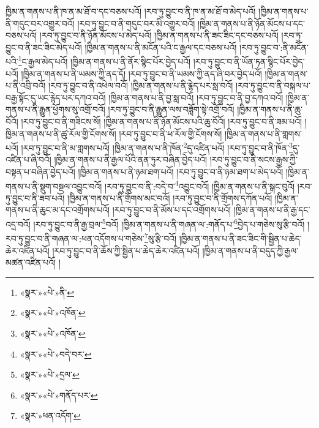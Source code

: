 ཁྱིམ་ན་གནས་པ་ནི་ཁ་ན་མ་ཐོ་བ་དང་བཅས་པའོ། །རབ་ཏུ་བྱུང་བ་ནི་ཁ་ན་མ་ཐོ་བ་མེད་པའོ། །ཁྱིམ་ན་གནས་པ་ནི་གདུང་བར་འགྱུར་བའོ། །རབ་ཏུ་བྱུང་བ་ནི་གདུང་བར་མི་འགྱུར་བའོ། །ཁྱིམ་ན་གནས་པ་ནི་ཉོན་མོངས་པ་དང་བཅས་པའོ། །རབ་ཏུ་བྱུང་བ་ནི་ཉོན་མོངས་པ་མེད་པའོ། །ཁྱིམ་ན་གནས་པ་ནི་ཟང་ཟིང་དང་བཅས་པའོ། །རབ་ཏུ་བྱུང་བ་ནི་ཟང་ཟིང་མེད་པའོ། །ཁྱིམ་ན་གནས་པ་ནི་མངོན་པའི་ང་རྒྱལ་དང་བཅས་པའོ། །རབ་ཏུ་བྱུང་བ་:ནི་མངོན་པའི་\footnote{«སྣར་»«པེ་»ནི་}ང་རྒྱལ་མེད་པའོ། །ཁྱིམ་ན་གནས་པ་ནི་ནོར་སྙིང་པོར་བྱེད་པའོ། །རབ་ཏུ་བྱུང་བ་ནི་ཡོན་ཏན་སྙིང་པོར་བྱེད་པའོ། །ཁྱིམ་ན་གནས་པ་ནི་ཡམས་ཀྱི་ནད་དོ། །རབ་ཏུ་བྱུང་བ་ནི་ཡམས་ཀྱི་ནད་ཞི་བར་བྱེད་པའོ། །ཁྱིམ་ན་གནས་པ་ནི་འབྲི་བའོ། །རབ་ཏུ་བྱུང་བ་ནི་འཕེལ་བའོ། །ཁྱིམ་ན་གནས་པ་ནི་རྙེད་པར་སླ་བའོ། །རབ་ཏུ་བྱུང་བ་ནི་བསྐལ་པ་བརྒྱ་སྟོང་དུ་ཡང་རྙེད་པར་དཀའ་བའོ། །ཁྱིམ་ན་གནས་པ་ནི་བྱ་སླ་བའོ། །རབ་ཏུ་བྱུང་བ་ནི་བྱ་དཀའ་བའོ། །ཁྱིམ་ན་གནས་པ་ནི་རྒྱུན་ཕྱོགས་སུ་འགྲོ་བའོ། །རབ་ཏུ་བྱུང་བ་ནི་རྒྱུན་ལས་བཟློག་སྟེ་འགྲོ་བའོ། །ཁྱིམ་ན་གནས་པ་ནི་ཆུ་བོའོ། །རབ་ཏུ་བྱུང་བ་ནི་གཟིངས་སོ། །ཁྱིམ་ན་གནས་པ་ནི་ཉོན་མོངས་པའི་ཆུ་བོའོ། །རབ་ཏུ་བྱུང་བ་ནི་ཟམ་པའོ། །ཁྱིམ་ན་གནས་པ་ནི་ཚུ་རོལ་གྱི་ངོགས་སོ། །རབ་ཏུ་བྱུང་བ་ནི་ཕ་རོལ་གྱི་ངོགས་སོ། །ཁྱིམ་ན་གནས་པ་ནི་གླགས་པའོ། །རབ་ཏུ་བྱུང་བ་ནི་མ་གླགས་པའོ། །ཁྱིམ་ན་གནས་པ་ནི་ཁོན་\footnote{«སྣར་»«པེ་»འཁོན་}དུ་འཛིན་པའོ། །རབ་ཏུ་བྱུང་བ་ནི་ཁོན་\footnote{«སྣར་»«པེ་»འཁོན་}དུ་འཛིན་པ་ཞི་བའོ། །ཁྱིམ་ན་གནས་པ་ནི་རྒྱལ་པོའི་ནན་ཏུར་བཞིན་བྱེད་པའོ། །རབ་ཏུ་བྱུང་བ་ནི་སངས་རྒྱས་ཀྱི་བསྟན་པ་བཞིན་བྱེད་པའོ། །ཁྱིམ་ན་གནས་པ་ནི་ཉམ་ཐག་པའོ། །རབ་ཏུ་བྱུང་བ་ནི་ཉམ་ཐག་པ་མེད་པའོ། །ཁྱིམ་ན་གནས་པ་ནི་སྡུག་བསྔལ་འབྱུང་བའོ། །རབ་ཏུ་བྱུང་བ་ནི་:བདེ་བ་\footnote{«སྣར་»«པེ་»བདེ་བར་}འབྱུང་བའོ། །ཁྱིམ་ན་གནས་པ་ནི་སྒང་བུའོ། །རབ་ཏུ་བྱུང་བ་ནི་ཟབ་པའོ། །ཁྱིམ་ན་གནས་པ་ནི་གྲོགས་མང་བའོ། །རབ་ཏུ་བྱུང་བ་ནི་གྲོགས་དཀོན་པའོ། །ཁྱིམ་ན་གནས་པ་ནི་ཆུང་མ་དང་འགྲོགས་པའོ། །རབ་ཏུ་བྱུང་བ་ནི་མོས་པ་དང་འགྲོགས་པའོ། །ཁྱིམ་ན་གནས་པ་ནི་རྒྱ་དང་འདྲ་བའོ། །རབ་ཏུ་བྱུང་བ་ནི་རྒྱ་བྲལ་\footnote{«སྣར་»«པེ་»དྲལ་}བའོ། །ཁྱིམ་ན་གནས་པ་ནི་གཞན་ལ་:གནོད་པ་\footnote{«སྣར་»«པེ་»གནོད་པར་}བྱེད་པ་གཅེས་སུ་རྩི་བའོ། །རབ་ཏུ་བྱུང་བ་ནི་གཞན་ལ་:ཕན་འདོགས་པ་གཅེས་\footnote{«སྣར་»ཕན་འདོག་}སུ་རྩི་བའོ། །ཁྱིམ་ན་གནས་པ་ནི་ཟང་ཟིང་གི་སྦྱིན་པ་ཆེད་ཆེར་འཛིན་པའོ། །རབ་ཏུ་བྱུང་བ་ནི་ཆོས་ཀྱི་སྦྱིན་པ་ཆེད་ཆེར་འཛིན་པའོ། །ཁྱིམ་ན་གནས་པ་ནི་བདུད་ཀྱི་རྒྱལ་མཚན་འཛིན་པའོ། །
